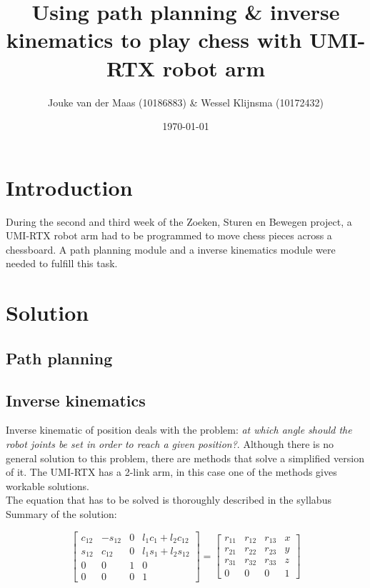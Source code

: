 \documentclass[a4paper, 11pt]{article}
\title{Using path planning \& inverse kinematics to play chess with UMI-RTX robot arm}
\author{Jouke van der Maas (10186883)  \& Wessel Klijnsma (10172432)}
\date{\today}
\begin{document}
\maketitle

\section{Introduction}
During the second and third week of the Zoeken, Sturen en Bewegen project, a UMI-RTX robot arm
had to be programmed to move chess pieces across a chessboard.  A path planning module and a 
inverse kinematics module were needed to fulfill this task. 

\section{Solution}

	\subsection{Path planning}
	
	\subsection{Inverse kinematics}\label{sec:invkin}
	Inverse kinematic of position deals with the problem: \textit{at which angle should the robot 
	joints be set in order to reach a given position?}. Although there is no general solution to this 
	problem, there are methods that solve a simplified version of it. The UMI-RTX has a 2-link arm, 
	in this case one of the methods gives workable solutions. \\
         The equation that has to be solved is thoroughly described in the syllabus \cite{ldorst01} 
         Summary of the solution:
        
         \begin{equation}
         \begin{bmatrix}
        c_{12} & -s_{12} & 0 & l_1c_1+l_2c_{12} \\
        s_{12} & c_{12} & 0 & l_1s_1 + l_2s_{12} \\
        0 & 0 & 1 & 0 \\
        0 & 0 & 0 & 1
        \end{bmatrix} =
        \begin{bmatrix}
        r_{11} & r_{12} & r_{13} & x \\
        r_{21} & r_{22} & r_{23} & y \\
        r_{31} & r_{32} & r_{33} & z \\
        0 & 0 & 0 & 1
        \end{bmatrix}
        \end{equation}
        
\end{document}
